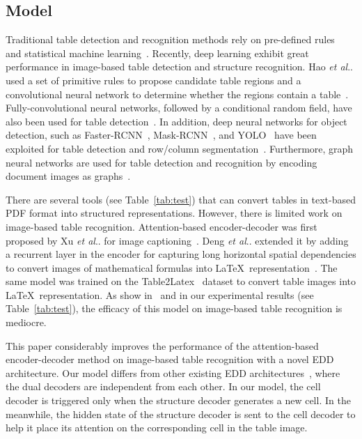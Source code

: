 \documentclass[conference]{IEEEtran}
\makeatletter
\DeclareRobustCommand\onedot{\futurelet\@let@token\@onedot}
\def\@onedot{\ifx\@let@token.\else.\null\fi\xspace}
\def\etal{\emph{et al}\onedot}
\makeatother
\begin{document}
\subsection{Model}

Traditional table detection and recognition methods rely on pre-defined
rules~\cite{hirayama1995method,tupaj1996extracting,hu1999medium,gatos2005automatic,shafait2010table,paliwal2019tablenet}
and statistical machine
learning~\cite{kieninger1998t,cesarini2002trainable,e2009learning,kasar2013learning,fan2015table}.
Recently, deep learning exhibit great performance in image-based table detection
and structure recognition. Hao \etal used a set of primitive rules to propose
candidate table regions and a convolutional neural network to determine whether
the regions contain a table~\cite{hao2016table}. Fully-convolutional neural
networks, followed by a conditional random field, have also been used for table
detection~\cite{he2017multi,kavasidis2019saliency,tensmeyer2019deep}. In
addition, deep neural networks for object detection, such as
Faster-RCNN~\cite{ren2015faster}, Mask-RCNN~\cite{he2017mask}, and
YOLO~\cite{redmon2016you} have been exploited for table detection and row/column
segmentation~\cite{schreiber2017deepdesrt,gilani2017table,staar2018corpus,zhong2019publaynet}.
Furthermore, graph neural networks are used for table detection and recognition
by encoding document images as graphs~\cite{qasim2019rethinking,riba2019table}.

There are several tools (see Table~\ref{tab:test}) that can convert tables in
text-based PDF format into structured representations. However, there is limited
work on image-based table recognition. Attention-based encoder-decoder was first
proposed by Xu \etal for image captioning~\cite{xu2015show}. Deng \etal extended
it by adding a recurrent layer in the encoder for capturing long horizontal
spatial dependencies to convert images of mathematical formulas into
\LaTeX~representation~\cite{deng2017image}. The same model was trained on the
Table2Latex~\cite{deng2019challenges} dataset to convert table images into
\LaTeX~representation. As show in~\cite{deng2019challenges} and in our
experimental results (see Table~\ref{tab:test}), the efficacy of this model on
image-based table recognition is mediocre.

This paper considerably improves the performance of the attention-based
encoder-decoder method on image-based table recognition with a novel EDD
architecture. Our model differs from other existing EDD
architectures~\cite{zhou2019branchgan,morais2019learning}, where the dual
decoders are independent from each other. In our model, the cell decoder is
triggered only when the structure decoder generates a new cell. In the
meanwhile, the hidden state of the structure decoder is sent to the cell decoder
to help it place its attention on the corresponding cell in the table image.
\end{document}
